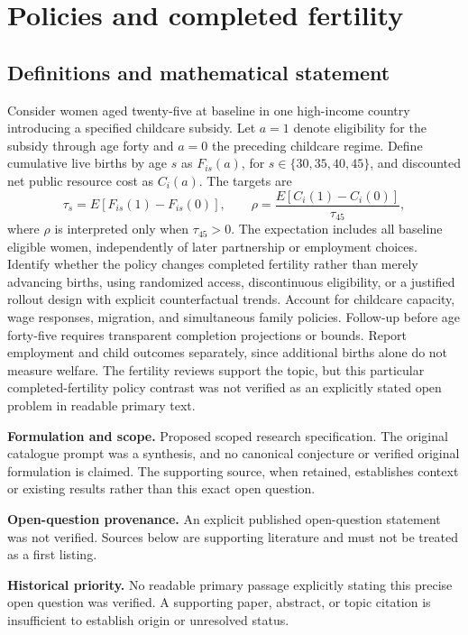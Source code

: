 \documentclass[11pt]{article}
\begin{document}
\section*{Policies and completed fertility}\label{30007738}
\subsection{Definitions and mathematical statement}
Consider women aged twenty-five at baseline in one high-income country introducing a specified childcare subsidy. Let \(a=1\) denote eligibility for the subsidy through age forty and \(a=0\) the preceding childcare regime. Define cumulative live births by age \(s\) as \(F_{is}(a)\), for \(s\in\{30,35,40,45\}\), and discounted net public resource cost as \(C_i(a)\). The targets are
\[\tau_s=E[F_{is}(1)-F_{is}(0)],\qquad\rho=\frac{E[C_i(1)-C_i(0)]}{\tau_{45}},\]
where \(\rho\) is interpreted only when \(\tau_{45}>0\). The expectation includes all baseline eligible women, independently of later partnership or employment choices. Identify whether the policy changes completed fertility rather than merely advancing births, using randomized access, discontinuous eligibility, or a justified rollout design with explicit counterfactual trends. Account for childcare capacity, wage responses, migration, and simultaneous family policies. Follow-up before age forty-five requires transparent completion projections or bounds. Report employment and child outcomes separately, since additional births alone do not measure welfare. The fertility reviews support the topic, but this particular completed-fertility policy contrast was not verified as an explicitly stated open problem in readable primary text.

\par\textbf{Formulation and scope.} Proposed scoped research specification. The original catalogue prompt was a synthesis, and no canonical conjecture or verified original formulation is claimed. The supporting source, when retained, establishes context or existing results rather than this exact open question.

\par\textbf{Open-question provenance.} An explicit published open-question statement was not verified. Sources below are supporting literature and must not be treated as a first listing.

\par\textbf{Historical priority.} No readable primary passage explicitly stating this precise open question was verified. A supporting paper, abstract, or topic citation is insufficient to establish origin or unresolved status.
\end{document}
